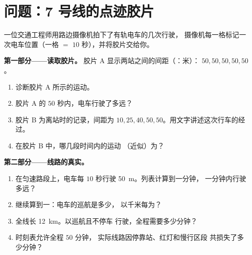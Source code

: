 \section{问题：7 号线的点迹胶片}

\begin{problem}\label{pb:g6:describing-motion:1}
一位交通工程师用路边摄像机拍下了有轨电车的几次行驶，
摄像机每一格标记一次电车位置（一格 $=$ $10$
秒），并将胶片交给你。

\medskip\noindent\textbf{第一部分——读取胶片。}
胶片 A 显示两站之间的间距（：米）：
$50, 50, 50, 50, 50$。
\begin{enumerate}
  \item 诊断胶片 A 所示的运动。
  \item 胶片 A 的 $50$ 秒内，电车行驶了多远？
  \item 胶片 B 为离站时的记录，间距为
        $10, 25, 40, 50, 50$。用文字讲述这次行车的经过。
  \item 在胶片 B 中，哪几段时间内的运动
        （近似）为？
\end{enumerate}

\medskip\noindent\textbf{第二部分——线路的真实。}
\begin{enumerate}[resume]
  \item 在匀速路段上，电车每
        $10$ 秒行驶 \qty{50}{m}。列表计算到一分钟，
        一分钟内行驶多远？
  \item 继续算到一：电车的巡航是多少，
        以千米每为？
  \item 全线长 \qty{12}{km}。以巡航且不停车
        行驶，全程需要多少分钟？
  \item 时刻表允许全程 $50$ 分钟，
        实际线路因停靠站、红灯和慢行区段
        共损失了多少分钟？
\end{enumerate}


\end{problem}
